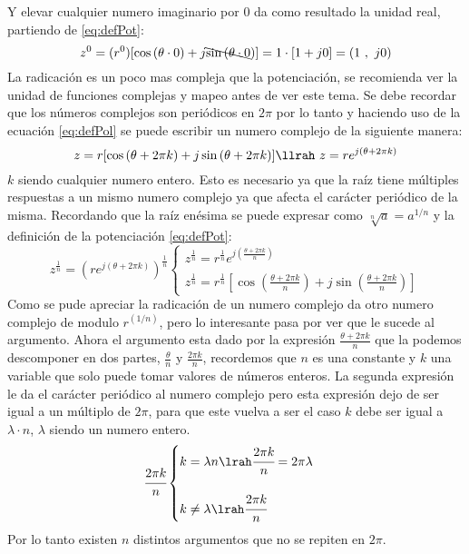     Y elevar cualquier numero imaginario por $0$ da como resultado la unidad real, partiendo de \ref{eq:defPot}:
    \begin{equation}
        z^0=(r^0)[\cos{(\theta \cdot 0)}+j \bcancel{\sin{(\theta \cdot 0}})] = 1\cdot[1+j0] = (1\ ,\ j0)
    \end{equation}
    La radicación es un poco mas compleja que la potenciación, se recomienda ver la unidad de funciones complejas y mapeo antes de ver este tema.
    Se debe recordar que los números complejos son periódicos en $2\pi$ por lo tanto y haciendo uso de la ecuación \ref{eq:defPol} se puede escribir un numero complejo de la siguiente manera:
    \begin{equation}
        z = r[\cos{(\theta + 2\pi k)}+j\sin{(\theta + 2\pi k)}] \llrah \ z = re^{j(\theta+2\pi k)}
    \end{equation}
    $k$ siendo cualquier numero entero.
    Esto es necesario ya que la raíz tiene múltiples respuestas a un mismo numero complejo ya que afecta el carácter periódico de la misma. Recordando que la raíz enésima se puede expresar como $\sqrt[n]{a}=a^{1/n}$ y la definición de la potenciación \ref{eq:defPot}:
    \begin{equation}\label{eq:defRad}
        z^{\frac{1}{n}} = (re^{j(\theta+2\pi k)})^{\frac{1}{n}}
        \begin{cases}
             z^{\frac{1}{n}} = r^{\frac{1}{n}}e^{j(\frac{\theta+2\pi k}{n})}\\
             \\
             z^{\frac{1}{n}} = r^{\frac{1}{n}}[\cos{(\frac{\theta + 2\pi k}{n})}+j\sin{(\frac{\theta + 2\pi k}{n})}]
        \end{cases}
    \end{equation}
    Como se pude apreciar la radicación de un numero complejo da otro numero complejo de modulo $r^{(1/n)}$, pero lo interesante pasa por ver que le sucede al argumento.
    Ahora el argumento esta dado por la expresión $\frac{\theta + 2\pi k}{n}$ que la podemos descomponer en dos partes, $\frac{\theta}{n}$ y $\frac{2\pi k}{n}$, recordemos que $n$ es una constante y $k$ una variable que solo puede tomar valores de números enteros. La segunda expresión le da el carácter periódico al numero complejo pero esta expresión dejo de ser igual a un múltiplo de $2\pi$, para que este vuelva a ser el caso $k$ debe ser igual a $\lambda \cdot n$, $\lambda$ siendo un numero entero.
    \begin{equation*}
        \cfrac{2\pi k}{n}
        \begin{cases}
            k=\lambda n \lrah \cfrac{2\pi k}{n} =  2\pi \lambda \\
            \\
            k \neq \lambda \lrah \cfrac{2\pi k}{n}
        \end{cases}
    \end{equation*}
    Por lo tanto existen $n$ distintos argumentos que no se repiten en $2\pi$.
    
